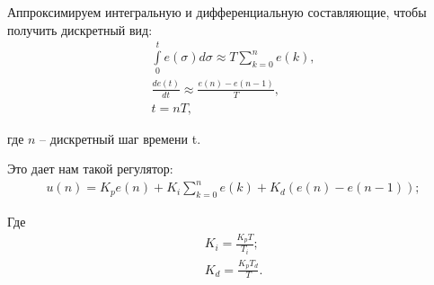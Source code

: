         Аппроксимируем интегральную и дифференциальную составляющие, чтобы
        получить дискретный вид:
        \begin{gather*}
            \int \limits_0^t e(\sigma)d\sigma \approx T \sum \limits_{k=0}^n e(k),\\
            \frac{de(t)}{dt} \approx \frac{e(n) - e(n - 1)}{T},\\
            t = nT,
        \end{gather*}

        где $n$ -- дискретный шаг времени t.

        Это дает нам такой регулятор:
        \begin{gather*}
            u(n) = K_p e(n) + K_i \sum \limits_{k=0}^n e(k) + K_d (e(n)-e(n-1));
        \end{gather*}

        Где
        \begin{gather*}
            K_i = \frac{K_p T}{T_i};\\
            K_d = \frac{K_p T_d}{T}.
        \end{gather*}

